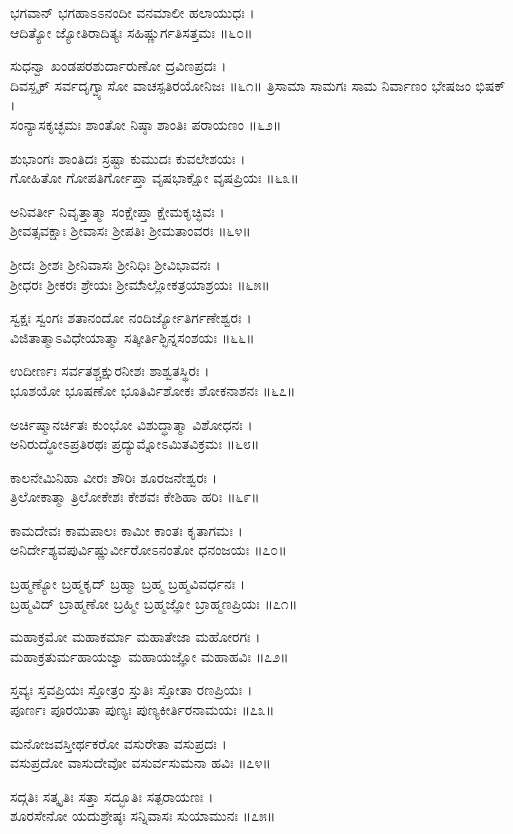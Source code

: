 ಭಗವಾನ್ ಭಗಹಾಽಽನಂದೀ ವನಮಾಲೀ ಹಲಾಯುಧಃ ।\\
ಆದಿತ್ಯೋ ಜ್ಯೋತಿರಾದಿತ್ಯಃ ಸಹಿಷ್ಣುರ್ಗತಿಸತ್ತಮಃ ॥೬೦॥

ಸುಧನ್ವಾ ಖಂಡಪರಶುರ್ದಾರುಣೋ ದ್ರವಿಣಪ್ರದಃ ।\\
ದಿವಸ್ಪೃಕ್ ಸರ್ವದೃಗ್ವ್ಯಾಸೋ ವಾಚಸ್ಪತಿರಯೋನಿಜಃ ॥೬೧॥
ತ್ರಿಸಾಮಾ ಸಾಮಗಃ ಸಾಮ ನಿರ್ವಾಣಂ ಭೇಷಜಂ ಭಿಷಕ್ ।\\
ಸಂನ್ಯಾಸಕೃಚ್ಛಮಃ ಶಾಂತೋ ನಿಷ್ಠಾ ಶಾಂತಿಃ ಪರಾಯಣಂ ॥೬೨॥

ಶುಭಾಂಗಃ ಶಾಂತಿದಃ ಸ್ರಷ್ಟಾ ಕುಮುದಃ ಕುವಲೇಶಯಃ ।\\
ಗೋಹಿತೋ ಗೋಪತಿರ್ಗೋಪ್ತಾ ವೃಷಭಾಕ್ಷೋ ವೃಷಪ್ರಿಯಃ ॥೬೩॥

ಅನಿವರ್ತೀ ನಿವೃತ್ತಾತ್ಮಾ ಸಂಕ್ಷೇಪ್ತಾ ಕ್ಷೇಮಕೃಚ್ಛಿವಃ ।\\
ಶ್ರೀವತ್ಸವಕ್ಷಾಃ ಶ್ರೀವಾಸಃ ಶ್ರೀಪತಿಃ ಶ್ರೀಮತಾಂವರಃ ॥೬೪॥

ಶ್ರೀದಃ ಶ್ರೀಶಃ ಶ್ರೀನಿವಾಸಃ ಶ್ರೀನಿಧಿಃ ಶ್ರೀವಿಭಾವನಃ ।\\
ಶ್ರೀಧರಃ ಶ್ರೀಕರಃ ಶ್ರೇಯಃ ಶ್ರೀಮಾಁಲ್ಲೋಕತ್ರಯಾಶ್ರಯಃ ॥೬೫॥

ಸ್ವಕ್ಷಃ ಸ್ವಂಗಃ ಶತಾನಂದೋ ನಂದಿರ್ಜ್ಯೋತಿರ್ಗಣೇಶ್ವರಃ ।\\
ವಿಜಿತಾತ್ಮಾಽವಿಧೇಯಾತ್ಮಾ ಸತ್ಕೀರ್ತಿಶ್ಛಿನ್ನಸಂಶಯಃ ॥೬೬॥

ಉದೀರ್ಣಃ ಸರ್ವತಶ್ಚಕ್ಷುರನೀಶಃ ಶಾಶ್ವತಸ್ಥಿರಃ ।\\
ಭೂಶಯೋ ಭೂಷಣೋ ಭೂತಿರ್ವಿಶೋಕಃ ಶೋಕನಾಶನಃ ॥೬೭॥

ಅರ್ಚಿಷ್ಮಾನರ್ಚಿತಃ ಕುಂಭೋ ವಿಶುದ್ಧಾತ್ಮಾ ವಿಶೋಧನಃ ।\\
ಅನಿರುದ್ಧೋಽಪ್ರತಿರಥಃ ಪ್ರದ್ಯುಮ್ನೋಽಮಿತವಿಕ್ರಮಃ ॥೬೮॥

ಕಾಲನೇಮಿನಿಹಾ ವೀರಃ ಶೌರಿಃ ಶೂರಜನೇಶ್ವರಃ ।\\
ತ್ರಿಲೋಕಾತ್ಮಾ ತ್ರಿಲೋಕೇಶಃ ಕೇಶವಃ ಕೇಶಿಹಾ ಹರಿಃ ॥೬೯॥

ಕಾಮದೇವಃ ಕಾಮಪಾಲಃ ಕಾಮೀ ಕಾಂತಃ ಕೃತಾಗಮಃ ।\\
ಅನಿರ್ದೇಶ್ಯವಪುರ್ವಿಷ್ಣುರ್ವೀರೋಽನಂತೋ ಧನಂಜಯಃ ॥೭೦॥

ಬ್ರಹ್ಮಣ್ಯೋ ಬ್ರಹ್ಮಕೃದ್ ಬ್ರಹ್ಮಾ ಬ್ರಹ್ಮ ಬ್ರಹ್ಮವಿವರ್ಧನಃ ।\\
ಬ್ರಹ್ಮವಿದ್ ಬ್ರಾಹ್ಮಣೋ ಬ್ರಹ್ಮೀ ಬ್ರಹ್ಮಜ್ಞೋ ಬ್ರಾಹ್ಮಣಪ್ರಿಯಃ ॥೭೧॥

ಮಹಾಕ್ರಮೋ ಮಹಾಕರ್ಮಾ ಮಹಾತೇಜಾ ಮಹೋರಗಃ ।\\
ಮಹಾಕ್ರತುರ್ಮಹಾಯಜ್ವಾ ಮಹಾಯಜ್ಞೋ ಮಹಾಹವಿಃ ॥೭೨॥

ಸ್ತವ್ಯಃ ಸ್ತವಪ್ರಿಯಃ ಸ್ತೋತ್ರಂ ಸ್ತುತಿಃ ಸ್ತೋತಾ ರಣಪ್ರಿಯಃ ।\\
ಪೂರ್ಣಃ ಪೂರಯಿತಾ ಪುಣ್ಯಃ ಪುಣ್ಯಕೀರ್ತಿರನಾಮಯಃ ॥೭೩॥

ಮನೋಜವಸ್ತೀರ್ಥಕರೋ ವಸುರೇತಾ ವಸುಪ್ರದಃ ।\\
ವಸುಪ್ರದೋ ವಾಸುದೇವೋ ವಸುರ್ವಸುಮನಾ ಹವಿಃ ॥೭೪॥

ಸದ್ಗತಿಃ ಸತ್ಕೃತಿಃ ಸತ್ತಾ ಸದ್ಭೂತಿಃ ಸತ್ಪರಾಯಣಃ ।\\
ಶೂರಸೇನೋ ಯದುಶ್ರೇಷ್ಠಃ ಸನ್ನಿವಾಸಃ ಸುಯಾಮುನಃ ॥೭೫॥

